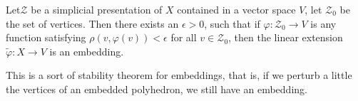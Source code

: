 \setcounter{proposition}{1}
\begin{proposition}\label{chap3-prop3.3.2}
Let\pageoriginale $\mathscr{Z}$ be a simplicial presentation of $X$ contained in a vector space $V$, let $\mathscr{Z}_{0}$ be the set of vertices. Then there exists an $\epsilon>0$, such that if $\varphi:\mathscr{Z}_{0}\to V$ is any function satisfying $\rho(v,\varphi(v))<\epsilon$ for all $v\in \mathscr{Z}_{0}$, then the linear extension $\widetilde{\varphi}:X\to V$ is an embedding.
\end{proposition}

This is a sort of stability theorem for embeddings, that is, if we perturb a little the vertices of an embedded polyhedron, we still have an embedding.





